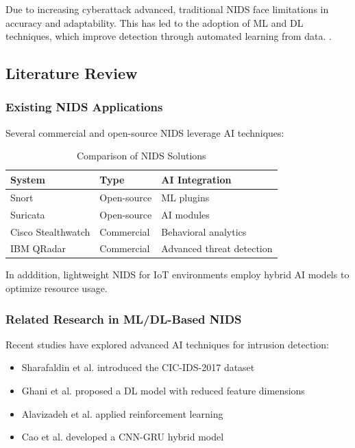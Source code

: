 \documentclass[conference]{IEEEtran}
\begin{document}
Due to increasing cyberattack advanced, traditional NIDS face limitations in accuracy and adaptability. This has led to the adoption of ML and DL techniques, which improve detection through automated learning from data. \cite{ghani2023deep,apruzzese2022cross,apruzzese2022cross,mukherjee2017network,alsulami2022deep,moustafa2017unsw}.

\subsection{Literature Review}

\subsubsection{Existing NIDS Applications}
Several commercial and open-source NIDS leverage AI techniques:

\begin{table}[h]
\centering
\caption{Comparison of NIDS Solutions}
\label{tab:nids_comparison}
\begin{tabular}{|l|l|l|}
\hline
\textbf{System} & \textbf{Type} & \textbf{AI Integration} \\ \hline
Snort & Open-source & ML plugins \\ \hline
Suricata & Open-source & AI modules \\ \hline
Cisco Stealthwatch & Commercial & Behavioral analytics \\ \hline
IBM QRadar & Commercial & Advanced threat detection \\ \hline
\end{tabular}
\end{table}

In adddition, lightweight NIDS for IoT environments employ hybrid AI models to optimize resource usage.
\cite{ahmed2016survey}\cite{kim2017deep}
\cite{yin2019deep}\cite{li2019intrusion}
\subsubsection{Related Research in ML/DL-Based NIDS}
Recent studies have explored advanced AI techniques for intrusion detection:

\begin{itemize}
    \item Sharafaldin et al. \cite{sharafaldin2018toward} introduced the CIC-IDS-2017 dataset
    \item Ghani et al. \cite{ghani2023deep} proposed a DL model with reduced feature dimensions
    \item Alavizadeh et al. \cite{alavizadeh2022deep} applied reinforcement learning
    \item Cao et al. \cite{cao2022network} developed a CNN-GRU hybrid model
\end{itemize}
\end{document}
